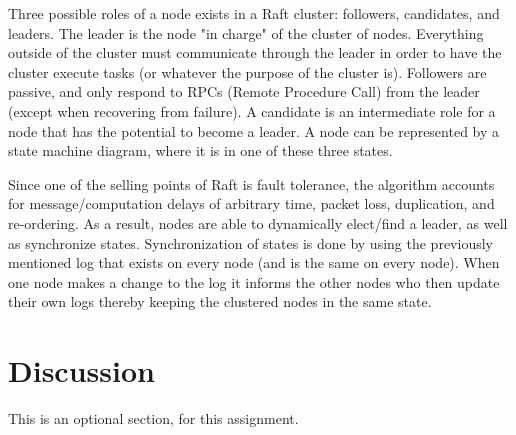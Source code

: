 \documentclass[11pt]{article}
\begin{document}
Three possible roles of a node exists in a Raft cluster: followers, candidates, and leaders. The leader is the node "in charge" of the cluster of nodes. Everything outside of the cluster must communicate through the leader in order to have the cluster execute tasks (or whatever the purpose of the cluster is). Followers are passive, and only respond to RPCs (Remote Procedure Call) from the leader (except when recovering from failure). A candidate is an intermediate role for a node that has the potential to become a leader. A node can be represented by a state machine diagram, where it is in one of these three states.

Since one of the selling points of Raft is fault tolerance, the algorithm accounts for message/computation delays of arbitrary time, packet loss, duplication, and re-ordering. As a result, nodes are able to dynamically elect/find a leader, as well as synchronize states. Synchronization of states is done by using the previously mentioned log that exists on every node (and is the same on every node). When one node makes a change to the log it informs the other nodes who then update their own logs thereby keeping the clustered nodes in the same state.

\section{Discussion}
This is an optional section, for this assignment.
\end{document}
